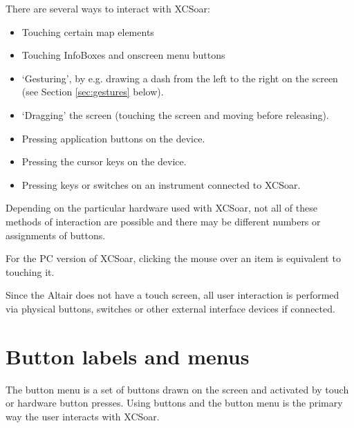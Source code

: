 There are several ways to interact with XCSoar:
\begin{itemize}
\item Touching certain map elements
\item Touching InfoBoxes and onscreen menu buttons
\item `Gesturing', by e.g. drawing a dash from the left to the right
  on the screen (see Section \ref{sec:gestures} below).
\item `Dragging' the screen (touching the screen and moving before releasing).
\item Pressing application buttons on the device.
\item Pressing the cursor keys on the device.
\item Pressing keys or switches on an instrument connected to XCSoar.
\end{itemize}
Depending on the particular hardware used with XCSoar, not all of these methods
of interaction are possible and there may be different numbers or assignments
of buttons.

For the PC version of XCSoar, clicking the mouse over an item is equivalent to
touching it.

Since the Altair does not have a touch screen, all user interaction is performed
via physical buttons, switches or other external interface devices if connected.

\section{Button labels and menus}
The button menu is a set of buttons drawn on the screen and activated by touch
or hardware button presses.  Using buttons and the button menu is the primary
way the user interacts with XCSoar.

